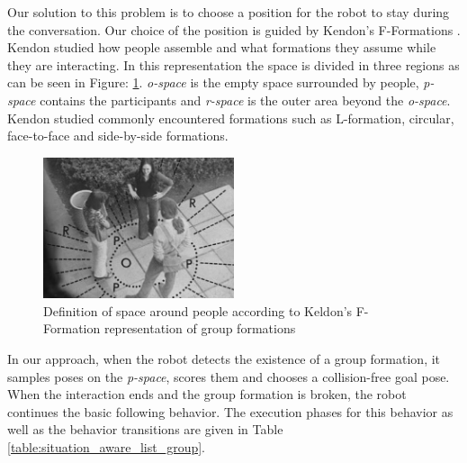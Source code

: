 Our solution to this problem is to choose a position for the robot to stay during the conversation. Our choice of the position is guided by Kendon's F-Formations \cite{kendon1990conducting}. Kendon studied how people assemble and what formations they assume while they are interacting. In this representation the space is divided in three regions as can be seen in Figure: \ref{fig:keldon}. \textit{o-space} is the empty space surrounded by people,  \textit{p-space} contains the participants and \textit{r-space} is the outer area beyond the \textit{o-space}. Kendon studied commonly encountered formations such as L-formation, circular, face-to-face and side-by-side formations.

\begin{figure}[ht!]
\centering
\includegraphics[width=0.5\textwidth]{pics/keldon}
\caption{Definition of space around people according to Keldon's F-Formation representation of group formations}
\label{fig:keldon}
\end{figure}

In our approach, when the robot detects the existence of a group formation, it samples poses on the \textit{p-space}, scores them and chooses a collision-free goal pose. When the interaction ends and the group formation is broken, the robot continues the basic following behavior. The execution phases for this behavior as well as the behavior transitions are given in Table \ref{table:situation_aware_list_group}.



